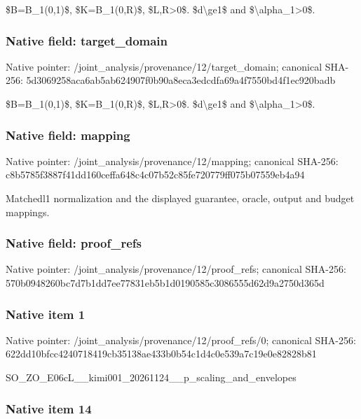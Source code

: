 \documentclass[10pt,a4paper]{article}
\begin{document}
\$B=B\_1(0,1)\$, \$K=B\_1(0,R)\$, \$L,R>0\$. \$d\textbackslash{}ge1\$ and \$\textbackslash{}alpha\_1>0\$.


\subsubsection{Native field: target\_domain}


Native pointer: /joint\_analysis/provenan\allowbreak{}ce/12/target\_domain; canonical SHA-256: 5d3069258aca6ab5ab624907\allowbreak{}f0b90a8eca3edcdfa69a4f75\allowbreak{}50bd4f1ec920badb


\$B=B\_1(0,1)\$, \$K=B\_1(0,R)\$, \$L,R>0\$. \$d\textbackslash{}ge1\$ and \$\textbackslash{}alpha\_1>0\$.


\subsubsection{Native field: mapping}


Native pointer: /joint\_analysis/provenance/12/mapping; canonical SHA-256: c8b5785f3887f41dd160ceff\allowbreak{}a648c4c07b52c85fe720779f\allowbreak{}f075b07559eb4a94


Matchedl1 normalization and the displayed guarantee, oracle, output and budget mappings.


\subsubsection{Native field: proof\_refs}


Native pointer: /joint\_analysis/provenan\allowbreak{}ce/12/proof\_refs; canonical SHA-256: 570b0948260bc7d7b1dd7ee7\allowbreak{}7831eb5b1d0190585c308655\allowbreak{}5d62d9a2750d365d



\subsubsection{Native item 1}


Native pointer: /joint\_analysis/provenan\allowbreak{}ce/12/proof\_refs/0; canonical SHA-256: 622dd10bfcc4240718419cb3\allowbreak{}5138ae433b0b54c1d4c0e539\allowbreak{}a7c19e0e82828b81


SO\_ZO\_E06cL\_\_kimi001\_202\allowbreak{}61124\_\_p\_scaling\_and\_env\allowbreak{}elopes


\subsubsection{Native item 14}
\end{document}
